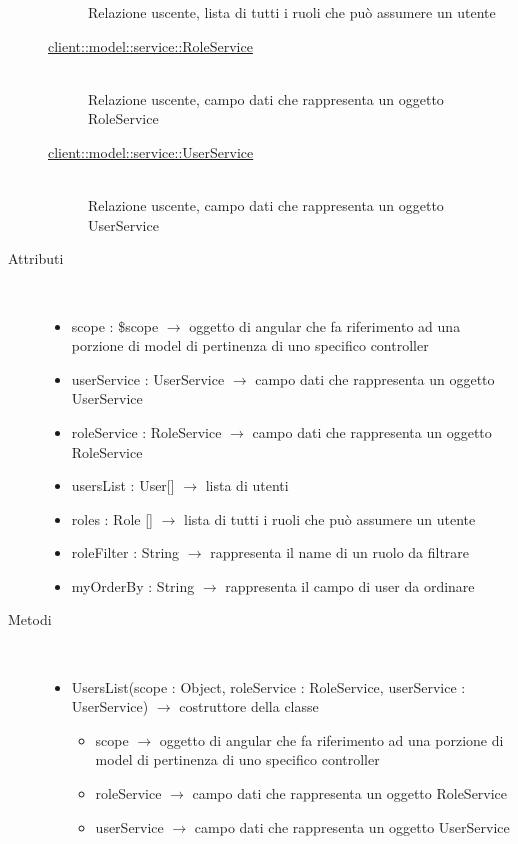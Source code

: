 \begin{description}
\begin{description}
	Relazione uscente, lista di tutti i ruoli che può assumere un utente
	\item[\hyperlink{client::model::service::RoleService}{client::model::service::RoleService}] \hfill \\
	Relazione uscente, campo dati che rappresenta un oggetto RoleService
	\item[\hyperlink{client::model::service::UserService}{client::model::service::UserService}] \hfill \\
	Relazione uscente, campo dati che rappresenta un oggetto UserService
\end{description}

\item[Attributi] \hfill \\
\vspace{-7mm}
\begin{itemize}
	\item scope : \$scope $\rightarrow$ oggetto di angular che fa riferimento ad una porzione di model di pertinenza di uno specifico controller
	\item userService : UserService $\rightarrow$ campo dati che rappresenta un oggetto UserService
	\item roleService : RoleService $\rightarrow$ campo dati che rappresenta un oggetto RoleService
	\item usersList : User[] $\rightarrow$ lista di utenti
	\item roles : Role [] $\rightarrow$ lista di tutti i ruoli che può assumere un utente
	\item roleFilter : String $\rightarrow$ rappresenta il name di un ruolo da filtrare
	\item myOrderBy : String $\rightarrow$ rappresenta il campo di user da ordinare
\end{itemize}

\item[Metodi] \hfill \\
\vspace{-7mm}
\begin{itemize}
	\item UsersList(scope : Object, roleService : RoleService, userService : UserService) $\rightarrow$ costruttore della classe\begin{itemize}
		\item scope $\rightarrow$ oggetto di angular che fa riferimento ad una porzione di model di pertinenza di uno specifico controller
		\item roleService $\rightarrow$ campo dati che rappresenta un oggetto RoleService
		\item userService $\rightarrow$ campo dati che rappresenta un oggetto UserService
	\end{itemize}
	

\end{itemize}
\end{description}
